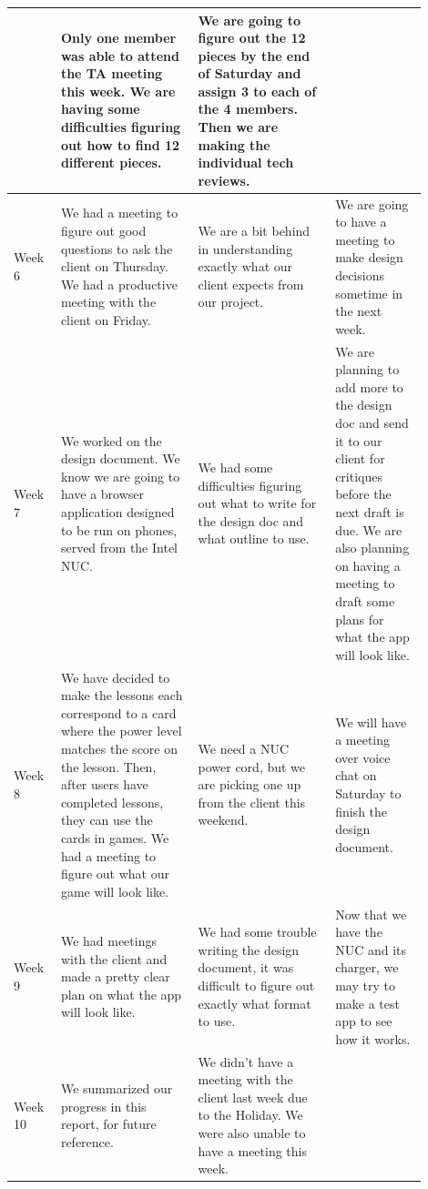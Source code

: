 \documentclass[draftclsnofoot,10pt,onecolumn]{IEEEtran}
\begin{document}
\begin{longtable}{p{0.1\linewidth}p{0.3\linewidth}p{0.3\linewidth}p{0.2\linewidth}}
             & Only one member was able to attend the TA meeting this week. We are having some difficulties figuring out how to find 12 different pieces.
             & We are going to figure out the 12 pieces by the end of Saturday and assign 3 to each of the 4 members. Then we are making the individual tech reviews.\\
            \hline
             Week 6
             & We had a meeting to figure out good questions to ask the client on Thursday. We had a productive meeting with the client on Friday.
             & We are a bit behind in understanding exactly what our client expects from our project.
             & We are going to have a meeting to make design decisions sometime in the next week.\\

            \hline
             Week 7
             & We worked on the design document. We know we are going to have a browser application designed to be run on phones, served from the Intel NUC.
             & We had some difficulties figuring out what to write for the design doc and what outline to use.
             & We are planning to add more to the design doc and send it to our client for critiques before the next draft is due. We are also planning on having a meeting to draft some plans for what the app will look like.\\
            \hline
             Week 8
             & We have decided to make the lessons each correspond to a card where the power level matches the score on the lesson. Then, after users have completed lessons, they can use the cards in games. We had a meeting to figure out what our game will look like.
             & We need a NUC power cord, but we are picking one up from the client this weekend.
             & We will have a meeting over voice chat on Saturday to finish the design document. \\
            \hline
             Week 9
             & We had meetings with the client and made a pretty clear plan on what the app will look like.
             & We had some trouble writing the design document, it was difficult to figure out exactly what format to use.
             & Now that we have the NUC and its charger, we may try to make a test app to see how it works.\\
            \hline
             Week 10
             & We summarized our progress in this report, for future reference.
             & We didn't have a meeting with the client last week due to the Holiday. We were also unable to have a meeting this week.

\end{longtable}
\end{document}
